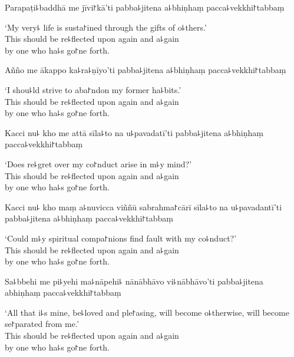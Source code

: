 Parapaṭi꜕baddhā me jīvi꜓kā'ti pabba꜕jitena a꜕bhiṇhaṃ pacca꜕vekkhi꜓tabbaṃ

\begin{english}
  `My very꜕ life is susta꜓ined through the gifts of o꜕thers.'\\
  This should be re꜕flected upon again and a꜕gain\\
  by one who ha꜕s go꜓ne forth.
\end{english}

Añño me ākappo ka꜕ra꜕ṇīyo'ti pabba꜕jitena a꜕bhiṇhaṃ pacca꜕vekkhi꜓tabbaṃ

\begin{english}
  `I shou꜕ld strive to aba꜓ndon my former ha꜕bits.'\\
  This should be re꜕flected upon again and a꜕gain\\
  by one who ha꜕s go꜓ne forth.
\end{english}

\clearpage

Kacci nu꜕ kho me attā sīla꜕to na u꜕pavadatī'ti pabba꜕jitena a꜕bhiṇhaṃ pacca꜕vekkhi꜓tabbaṃ

\begin{english}
  `Does re꜕gret over my co꜓nduct arise in m꜕y mind?'\\
  This should be re꜕flected upon again and a꜕gain\\
  by one who ha꜕s go꜓ne forth.
\end{english}

Kacci nu꜕ kho maṃ a꜕nuvicca viññū sabrahma꜓cārī sīla꜕to na u꜕pavadantī'ti pabba꜕jitena a꜕bhiṇhaṃ pacca꜕vekkhi꜓tabbaṃ

\begin{english}
  `Could m꜕y spiritual compa꜓nions find fault with my co꜕nduct?'\\
  This should be re꜕flected upon again and a꜕gain\\
  by one who ha꜕s go꜓ne forth.
\end{english}

Sa꜕bbehi me pi꜕yehi ma꜕nāpehi꜕ nānābhāvo vi꜕nābhāvo'ti pabba꜕jitena abhiṇhaṃ pacca꜕vekkhi꜓tabbaṃ

\begin{english}
  `All that i꜕s mine, be꜕loved and ple꜓asing, will become o꜕therwise, will become se꜓parated from me.'\\
  This should be re꜕flected upon again and a꜕gain\\
  by one who ha꜕s go꜓ne forth.
\end{english}

